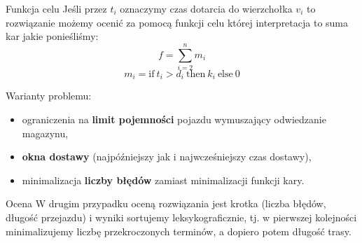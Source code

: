 \begin{frame}
        \begin{block}{Funkcja celu}
                Jeśli przez $t_i$ oznaczymy czas dotarcia do wierzchołka $v_i$ to rozwiązanie możemy ocenić za pomocą funkcji celu której interpretacja to suma kar jakie ponieśliśmy:
\begin{equation}
        f = \sum\limits_{i=2}^{n} m_i
\end{equation}
\begin{equation}
m_i = \text{if} \ t_i > d_i \ \text{then} \ k_i \ \text{else} \ 0
\end{equation}
        \end{block}
\end{frame}

\begin{frame}
Warianty problemu:
\begin{itemize}
\item ograniczenia na \textbf{limit pojemności} pojazdu wymuszający odwiedzanie magazynu,
\item \textbf{okna dostawy} (najpóźniejszy jak i najwcześniejszy czas dostawy),
\item minimalizacja \textbf{liczby błędów} zamiast minimalizacji funkcji kary.
\end{itemize}
\begin{block}{Ocena}
    W drugim przypadku oceną rozwiązania jest krotka (liczba błędów, długość przejazdu) i wyniki sortujemy leksykograficznie, tj. w pierwszej kolejności minimalizujemy liczbę przekroczonych terminów, a dopiero potem długość trasy.
\end{block}

\end{frame}
